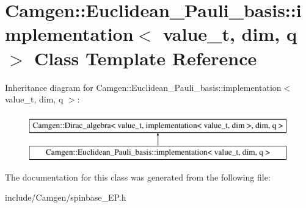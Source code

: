\hypertarget{a00288}{}\section{Camgen\+:\+:Euclidean\+\_\+\+Pauli\+\_\+basis\+:\+:implementation$<$ value\+\_\+t, dim, q $>$ Class Template Reference}
\label{a00288}
Inheritance diagram for Camgen\+:\+:Euclidean\+\_\+\+Pauli\+\_\+basis\+:\+:implementation$<$ value\+\_\+t, dim, q $>$\+:\begin{figure}[H]
\begin{center}
\leavevmode
\includegraphics[height=2.000000cm]{a00288}
\end{center}
\end{figure}


The documentation for this class was generated from the following file\+:\begin{DoxyCompactItemize}
\item 
include/\+Camgen/spinbase\+\_\+\+E\+P.\+h\end{DoxyCompactItemize}
